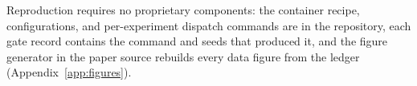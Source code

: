 Reproduction requires no proprietary components: the container recipe, configurations, and per-experiment dispatch commands are in the repository, each gate record contains the command and seeds that produced it, and the figure generator in the paper source rebuilds every data figure from the ledger (Appendix~\ref{app:figures}).
